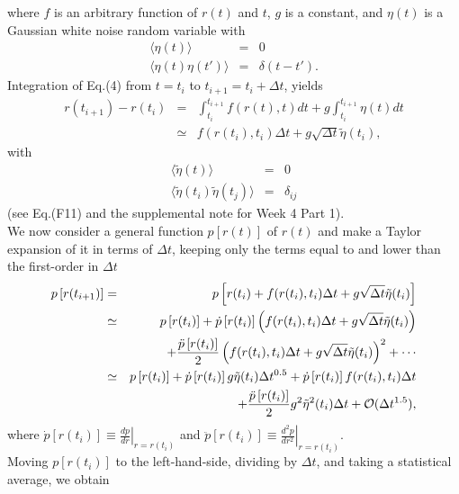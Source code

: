 \documentclass[a4paper,11pt]{article}
\begin{document}
where $f$ is an arbitrary function of $r(t)$ and $t$, $g$ is a
constant, and $\eta(t)$ is a Gaussian white noise random variable with
\begin{eqnarray}
\langle\eta(t)\rangle&=&0\\
\langle\eta(t)\eta(t')\rangle&=&\delta(t-t').
\end{eqnarray}
Integration of Eq.(4) from $t=t_i$ to $t_{i+1}=t_i+\Delta t$, yields 
\begin{eqnarray}
r(t_{i+1})-r(t_i)&=& \int_{t_i}^{t_{i+1}}f(r(t),t)dt + g\int_{t_i}^{t_{i+1}}\eta(t)dt\\
&\simeq& f(r(t_i),t_i)\Delta t + g\sqrt{\Delta t}\tilde{\eta}(t_i),
\end{eqnarray}
with
\begin{eqnarray}
\langle\tilde{\eta}(t)\rangle&=&0\\
\langle\tilde{\eta}(t_i)\tilde{\eta}(t_j)\rangle&=&\delta_{ij}
\end{eqnarray}
(see Eq.(F11) and the supplemental note for Week 4 Part 1).
\\
We now consider a general function $p\left[r(t)\right]$ of $r(t)$ and
make a Taylor expansion of it in terms of $\Delta t$, keeping only the
terms equal to and lower than the first-order in $\Delta t$
\begin{eqnarray}
p\left[r(t_{i+1})\right]&=&p\left[r(t_i)+f(r(t_i),t_i)\Delta t + g\sqrt{\Delta t}\tilde{\eta}(t_i)\right]\\
&\simeq&
p\left[r(t_{i})\right]+\dot{p}\left[r(t_{i})\right]
\left(f(r(t_i),t_i)\Delta t+g\sqrt{\Delta t}\tilde{\eta}(t_i)\right)\nonumber\\
&&+\frac{\ddot{p}\left[r(t_{i})\right]}{2}\left(f(r(t_i),t_i)\Delta t+g\sqrt{\Delta t}\tilde{\eta}(t_i)\right)^2+\cdots\\
&\simeq&
p\left[r(t_{i})\right]
+\dot{p}\left[r(t_{i})\right]g\tilde{\eta}(t_i)\Delta t^{0.5}
+\dot{p}\left[r(t_{i})\right]f(r(t_i),t_i)\Delta t\nonumber\\
&&+\frac{\ddot{p}\left[r(t_{i})\right]}{2}g^2\tilde{\eta}^2(t_i)\Delta t+{\cal O}(\Delta t^{1.5}),
\end{eqnarray}
where $\dot{p}\left[r(t_{i})\right]\equiv\left.\frac{dp}{dr}\right|_{r=r(t_{i})}$ and
$\ddot{p}\left[r(t_{i})\right]\equiv\left.\frac{d^2p}{dr^2}\right|_{r=r(t_{i})}$.
\\
Moving $p\left[r(t_{i})\right]$ to the left-hand-side, dividing by
$\Delta t$, and taking a statistical average, we obtain 
\end{document}
